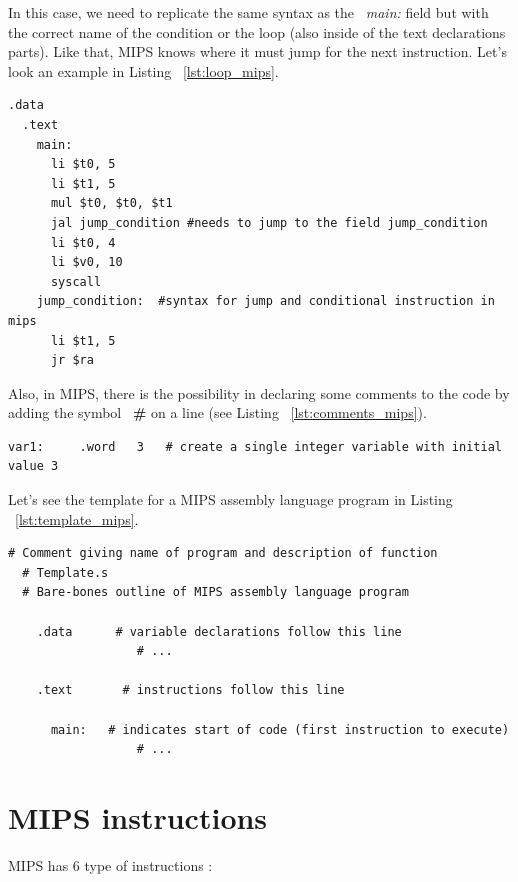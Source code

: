 \documentclass[
  oneside,
  11pt, a4paper,
  footinclude=true,
  headinclude=true,
  cleardoublepage=empty
]{scrbook}
\begin{document}
In this case, we need to replicate the same syntax as the ~\textit{main:} field but with the correct name of the condition or the loop (also inside of the text declarations parts). Like that, MIPS knows where it must jump for the next instruction.
Let's look an example in Listing ~\ref{lst:loop_mips}.

\begin{lstlisting}[caption={Example of a loop declaration in MIPS},label={lst:loop_mips}]
  .data 
  .text 
    main:
      li $t0, 5
      li $t1, 5
      mul $t0, $t0, $t1
      jal jump_condition #needs to jump to the field jump_condition
      li $t0, 4
      li $v0, 10
      syscall 
    jump_condition:  #syntax for jump and conditional instruction in mips
      li $t1, 5
      jr $ra
\end{lstlisting}

Also, in MIPS, there is the possibility in declaring some comments to the code by adding the symbol ~\textbf{\#}  on a line (see Listing ~\ref{lst:comments_mips}).

\begin{lstlisting}[caption={Example of a comment in MIPS},label={lst:comments_mips}]
  var1:		.word	3	# create a single integer variable with initial value 3
\end{lstlisting}

Let's see the template for a MIPS assembly language program in Listing ~\ref{lst:template_mips}.

\begin{lstlisting}[caption={Template of a MIPS assembly language},label={lst:template_mips}]
  # Comment giving name of program and description of function
  # Template.s
  # Bare-bones outline of MIPS assembly language program

    .data      # variable declarations follow this line
                  # ...
														
    .text       # instructions follow this line	
																	
      main:   # indicates start of code (first instruction to execute)
                  # ...
\end{lstlisting}








\section{MIPS instructions}
\label{sec:mips_instructions}
MIPS has 6 type of instructions :
\end{document}
